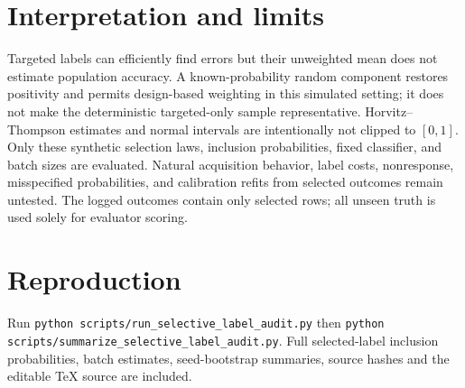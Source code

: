 \documentclass[10pt,a4paper]{article}
\begin{document}
\section*{Interpretation and limits}
Targeted labels can efficiently find errors but their unweighted mean does not estimate population accuracy. A known-probability random component restores positivity and permits design-based weighting in this simulated setting; it does not make the deterministic targeted-only sample representative. Horvitz--Thompson estimates and normal intervals are intentionally not clipped to \([0,1]\). Only these synthetic selection laws, inclusion probabilities, fixed classifier, and batch sizes are evaluated. Natural acquisition behavior, label costs, nonresponse, misspecified probabilities, and calibration refits from selected outcomes remain untested. The logged outcomes contain only selected rows; all unseen truth is used solely for evaluator scoring.
\section*{Reproduction}
Run \texttt{python scripts/run\_selective\_label\_audit.py} then \texttt{python scripts/summarize\_selective\_label\_audit.py}. Full selected-label inclusion probabilities, batch estimates, seed-bootstrap summaries, source hashes and the editable TeX source are included.
\end{document}
